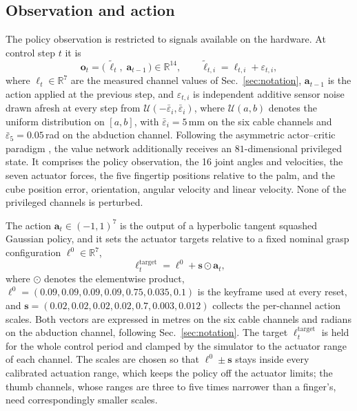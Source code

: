 \documentclass[11pt]{article}
\begin{document}
\subsection{Observation and action}
The policy observation is restricted to signals available on the hardware.
At control step $t$ it is
\begin{equation}
  \mathbf{o}_t = \bigl(\, \tilde{\boldsymbol{\ell}}_t,\; \mathbf{a}_{t-1} \,\bigr) \in \mathbb{R}^{14},
  \qquad
  \tilde{\ell}_{t,i} = \ell_{t,i} + \varepsilon_{t,i},
  \label{eq:obs}
\end{equation}
where $\boldsymbol{\ell}_t \in \mathbb{R}^{7}$ are the measured channel values of Sec.~\ref{sec:notation}, $\mathbf{a}_{t-1}$ is the action applied at the previous step, and $\varepsilon_{t,i}$ is independent additive sensor noise drawn afresh at every step from $\mathcal{U}(-\bar\varepsilon_i, \bar\varepsilon_i)$, where $\mathcal{U}(a,b)$ denotes the uniform distribution on $[a,b]$, with $\bar\varepsilon_i = 5$\,mm on the six cable channels and $\bar\varepsilon_5 = 0.05$\,rad on the abduction channel.
Following the asymmetric actor--critic paradigm \cite{pinto2018asymmetric}, the value network additionally receives an $81$-dimensional privileged state.
It comprises the policy observation, the 16 joint angles and velocities, the seven actuator forces, the five fingertip positions relative to the palm, and the cube position error, orientation, angular velocity and linear velocity.
None of the privileged channels is perturbed.

The action $\mathbf{a}_t \in (-1,1)^{7}$ is the output of a hyperbolic tangent squashed Gaussian policy, and it sets the actuator targets relative to a fixed nominal grasp configuration $\boldsymbol{\ell}^{0} \in \mathbb{R}^{7}$,
\begin{equation}
  \boldsymbol{\ell}_t^{\mathrm{target}} = \boldsymbol{\ell}^{0} + \mathbf{s} \odot \mathbf{a}_t,
  \label{eq:action}
\end{equation}
where $\odot$ denotes the elementwise product, $\boldsymbol{\ell}^{0} = (0.09, 0.09, 0.09, 0.09, 0.75, 0.035, 0.1)$ is the keyframe used at every reset, and $\mathbf{s} = (0.02, 0.02, 0.02, 0.02, 0.7, 0.003, 0.012)$ collects the per-channel action scales.
Both vectors are expressed in metres on the six cable channels and radians on the abduction channel, following Sec.~\ref{sec:notation}.
The target $\boldsymbol{\ell}_t^{\mathrm{target}}$ is held for the whole control period and clamped by the simulator to the actuator range of each channel.
The scales are chosen so that $\boldsymbol{\ell}^{0} \pm \mathbf{s}$ stays inside every calibrated actuation range, which keeps the policy off the actuator limits; the thumb channels, whose ranges are three to five times narrower than a finger's, need correspondingly smaller scales.
\end{document}
